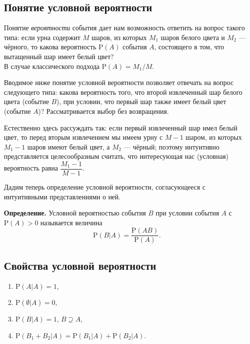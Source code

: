 \documentclass[11pt,a4paper]{article}
\providecommand{\tightlist}{%
      \setlength{\itemsep}{0pt}\setlength{\parskip}{0pt}}
\begin{document}
\hypertarget{ux43fux43eux43dux44fux442ux438ux435-ux443ux441ux43bux43eux432ux43dux43eux439-ux432ux435ux440ux43eux44fux442ux43dux43eux441ux442ux438}{%
\subsection{Понятие условной
вероятности}\label{ux43fux43eux43dux44fux442ux438ux435-ux443ux441ux43bux43eux432ux43dux43eux439-ux432ux435ux440ux43eux44fux442ux43dux43eux441ux442ux438}}

Понятие \emph{вероятности} события дает нам возможность ответить на
вопрос такого типа: если урна содержит \(M\) шаров, из которых \(M_1\)
шаров белого цвета и \(M_2\) --- чёрного, то какова вероятность
\(\mathrm{P}(A)\) события \(A\), состоящего в том, что вытащенный шар
имеет белый цвет?\\
В случае классического подхода \(\mathrm{P}(A) =M_1/M\).

Вводимое ниже понятие условной вероятности позволяет отвечать на вопрос
следующего типа: какова вероятность того, что второй извлеченный шар
белого цвета (событие \(B\)), при условии, что первый шар также имеет
белый цвет (событие \(A\))? Рассматривается выбор без возвращения.

Естественно здесь рассуждать так: если первый извлеченный шар имел белый
цвет, то перед вторым извлечением мы имеем урну с \(M-1\) шаром, из
которых \(M_1 - 1\) шаров имеют белый цвет, а \(M_2\) --- чёрный;
поэтому интуитивно представляется целесообразным считать, что
интересующая нас (условная) вероятность равна \(\dfrac{M_1-1}{M-1}\).

Дадим теперь определение условной вероятности, согласующееся с
интуитивными представлениями о ней.

\textbf{Определение.} Условной вероятностью события \(B\) при условии
события \(A\) с \(\mathrm{P}(A)>0\) называется величина
\[ \mathrm{P}(B|A) = \dfrac{\mathrm{P}(AB)}{\mathrm{P}(A)}. \]

    \hypertarget{ux441ux432ux43eux439ux441ux442ux432ux430-ux443ux441ux43bux43eux432ux43dux43eux439-ux432ux435ux440ux43eux44fux442ux43dux43eux441ux442ux438}{%
\subsection{Свойства условной
вероятности}\label{ux441ux432ux43eux439ux441ux442ux432ux430-ux443ux441ux43bux43eux432ux43dux43eux439-ux432ux435ux440ux43eux44fux442ux43dux43eux441ux442ux438}}

\begin{enumerate}
\def\labelenumi{\arabic{enumi}.}
\tightlist
\item
  \(\mathrm{P}(A|A) = 1\),
\item
  \(\mathrm{P}(\emptyset|A) = 0\),
\item
  \(\mathrm{P}(B|A) = 1\), \(B \supseteq A\),
\item
  \(\mathrm{P}(B_1 + B_2|A) = \mathrm{P}(B_1|A) + \mathrm{P}(B_2|A)\).
\end{enumerate}
\end{document}
